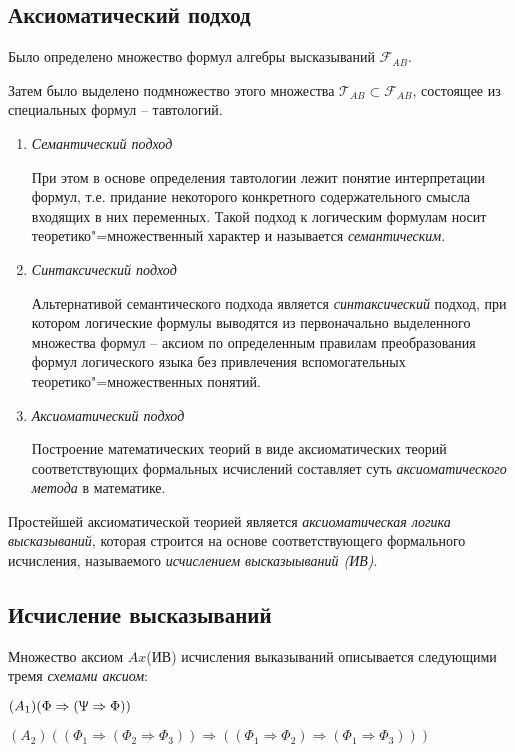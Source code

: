 \subsection*{Аксиоматический подход}
Было определено множество формул алгебры высказываний $\mathscr{F}_{AB}$.

Затем было выделено подмножество этого множества $\mathscr{T}_{AB}\subset\mathscr{F}_{AB}$, состоящее из специальных формул -- тавтологий.

\begin{enumerate}
    \item \textit{Семантический подход}
    
    При этом в основе определения тавтологии лежит понятие интерпретации формул, т.е. придание некоторого конкретного содержательного смысла входящих в них переменных. Такой подход к логическим формулам носит теоретико"=множественный характер и называется \textit{семантическим}.

    \item \textit{Синтаксический подход}
    
    Альтернативой семантического подхода является \textit{синтаксический} подход, при котором логические формулы выводятся из первоначально выделенного множества формул -- аксиом по определенным правилам преобразования формул логического языка без привлечения вспомогательных теоретико"=множественных понятий.

    \item \textit{Аксиоматический подход}
    
    Построение математических теорий в виде аксиоматических теорий соответствующих формальных исчислений составляет суть \textit{аксиоматического метода} в математике.
\end{enumerate}

Простейшей аксиоматической теорией является \textit{аксиоматическая логика высказываний}, которая строится на основе соответствующего формального исчисления, называемого \textit{исчислением высказыываний (ИВ)}.

\subsection*{Исчисление высказываний}
Множество аксиом $Ax$(ИВ) исчисления выказываний описывается следующими тремя \textit{схемами аксиом}:

$(A_1)(\Phi\Rightarrow(\Uppsi\Rightarrow\Phi))$

$(A_2)((\Phi_1\Rightarrow(\Phi_2\Rightarrow\Phi_3))\Rightarrow((\Phi_1\Rightarrow\Phi_2)\Rightarrow(\Phi_1\Rightarrow\Phi_3)))$

